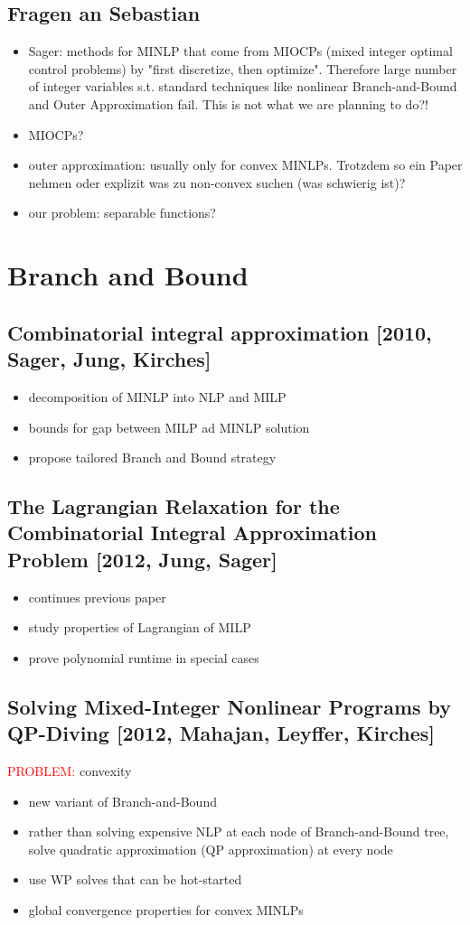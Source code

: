 \documentclass{article}
\begin{document}
\subsection{Fragen an Sebastian}
\begin{itemize}
\item Sager: methods for MINLP that come from MIOCPs (mixed integer optimal control problems) by "first discretize, then optimize". Therefore large number of integer variables s.t. standard techniques like nonlinear Branch-and-Bound and Outer Approximation fail. This is not what we are planning to do?!
\item MIOCPs?
\item outer approximation: usually only for convex MINLPs. Trotzdem so ein Paper nehmen oder explizit was zu non-convex suchen (was schwierig ist)?
\item our problem: separable functions?
\end{itemize}
\newpage
\section{Branch and Bound}
\subsection{Combinatorial integral approximation [2010, Sager, Jung, Kirches]}
\begin{itemize}
\item decomposition of MINLP into NLP and MILP
\item bounds for gap between MILP ad MINLP solution
\item propose tailored Branch and Bound strategy
\end{itemize}
\subsection{The Lagrangian Relaxation for the Combinatorial Integral Approximation Problem [2012, Jung, Sager]}
\begin{itemize}
\item continues previous paper
\item study properties of Lagrangian of MILP
\item prove polynomial runtime in special cases
\end{itemize}
\subsection{Solving Mixed-Integer Nonlinear Programs by QP-Diving [2012, Mahajan, Leyffer, Kirches]}
\textcolor{red}{PROBLEM:} convexity
\begin{itemize}
\item new variant of Branch-and-Bound
\item rather than solving expensive NLP at each node of Branch-and-Bound tree, solve quadratic approximation (QP approximation) at every node
\item use WP solves that can be hot-started
\item global convergence properties for convex MINLPs
\end{itemize}
\newpage
\end{document}
